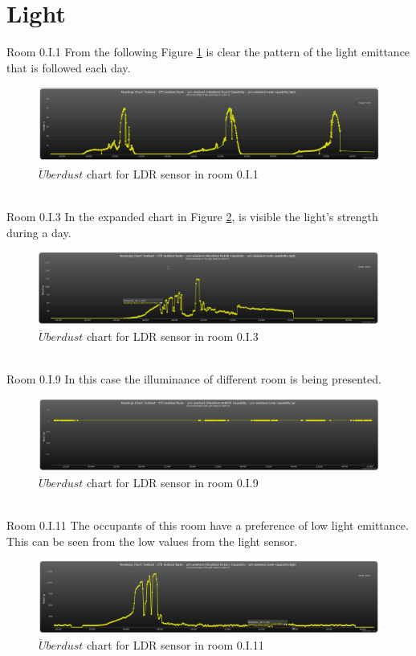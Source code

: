 \documentclass[12pt,a4paper,draft]{report}
\begin{document}
\section{Light}
%
{Room 0.I.1}
%
From the following Figure \ref{chart_light_1} is clear the pattern of the light emittance that is followed each day.
\begin{figure}[H]
\centering
\includegraphics*[scale=0.3]{light_1}
\caption{$\ddot{U}berdust$ chart for LDR sensor in room 0.I.1}
\label{chart_light_1}
\end{figure}
\ \\
%
{Room 0.I.3}
%
In the expanded chart in Figure \ref{chart_light_3}, is visible the light's strength during a day.
\begin{figure}[H]
\centering
\includegraphics*[scale=0.3]{light_3}
\caption{$\ddot{U}berdust$ chart for LDR sensor in room 0.I.3}
\label{chart_light_3}
\end{figure}
\ \\
%
{Room 0.I.9}
%
In this case the illuminance of different room is being presented.
\begin{figure}[H]
\centering
\includegraphics*[scale=0.3]{pir_9}
\caption{$\ddot{U}berdust$ chart for LDR sensor in room 0.I.9}
\label{chart_light_9}
\end{figure}
\ \\
%
{Room 0.I.11}
%
The occupants of this room have a preference of low light emittance. This can be seen from the low values from the light sensor.
\begin{figure}[H]
\centering
\includegraphics*[scale=0.3]{light_11}
\caption{$\ddot{U}berdust$ chart for LDR sensor in room 0.I.11}
\label{chart_light_11}
\end{figure}
\ \\
%
\end{document}
